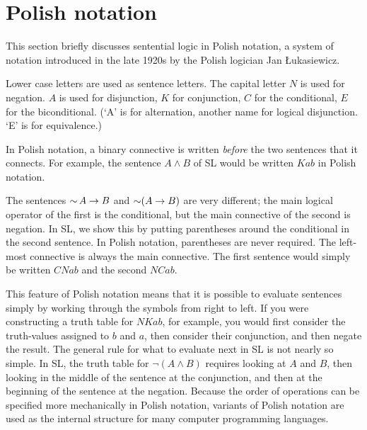 \section*{Polish notation}

This section briefly discusses sentential logic in Polish notation, a system of notation introduced in the late 1920s by the Polish logician Jan {\L}ukasiewicz.

Lower case letters are used as sentence letters. The capital letter $N$ is used for negation. $A$ is used for disjunction, $K$ for conjunction, $C$ for the conditional, $E$ for the biconditional. (`A' is for alternation, another name for logical disjunction. `E' is for equivalence.)

In Polish notation, a binary connective is written \emph{before} the two sentences that it connects. For example, the sentence $A\land B$ of SL would be written $Kab$ in Polish notation.

The sentences $\mathop{\sim} A\mathrel{\rightarrow} B$ and $\mathop{\sim} (A\mathrel{\rightarrow} B)$ are very different; the main logical operator of the first is the conditional, but the main connective of the second is negation. In SL, we show this by putting parentheses around the conditional in the second sentence. In Polish notation, parentheses are never required. The left-most connective is always the main connective. The first sentence would simply be written $CNab$ and the second $NCab$.

This feature of Polish notation means that it is possible to evaluate sentences simply by working through the symbols from right to left. If you were constructing a truth table for $NKab$, for example, you would first consider the truth-values assigned to $b$ and $a$, then consider their conjunction, and then negate the result. The general rule for what to evaluate next in SL is not nearly so simple. In SL, the truth table for $\lnot(A\land B)$ requires looking at $A$ and $B$, then looking in the middle of the sentence at the conjunction, and then at the beginning of the sentence at the negation. Because the order of operations can be specified more mechanically in Polish notation, variants of Polish notation are used as the internal structure for many computer programming languages.
